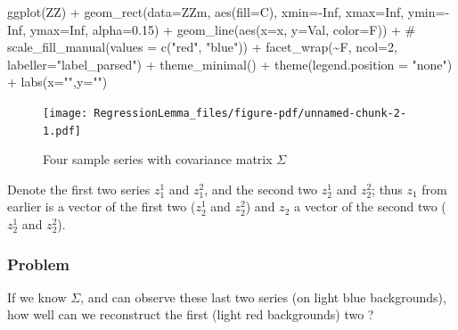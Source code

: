 \documentclass[
  letterpaper,
]{book}
\newenvironment{Shaded}{\begin{snugshade}}{\end{snugshade}}
\newcommand{\AttributeTok}[1]{\textcolor[rgb]{0.40,0.45,0.13}{#1}}
\newcommand{\CommentTok}[1]{\textcolor[rgb]{0.37,0.37,0.37}{#1}}
\newcommand{\ConstantTok}[1]{\textcolor[rgb]{0.56,0.35,0.01}{#1}}
\newcommand{\DecValTok}[1]{\textcolor[rgb]{0.68,0.00,0.00}{#1}}
\newcommand{\FloatTok}[1]{\textcolor[rgb]{0.68,0.00,0.00}{#1}}
\newcommand{\FunctionTok}[1]{\textcolor[rgb]{0.28,0.35,0.67}{#1}}
\newcommand{\NormalTok}[1]{\textcolor[rgb]{0.00,0.23,0.31}{#1}}
\newcommand{\SpecialCharTok}[1]{\textcolor[rgb]{0.37,0.37,0.37}{#1}}
\newcommand{\StringTok}[1]{\textcolor[rgb]{0.13,0.47,0.30}{#1}}
\begin{document}
\begin{Shaded}
\begin{Highlighting}[]
\FunctionTok{ggplot}\NormalTok{(ZZ) }\SpecialCharTok{+}   
  \FunctionTok{geom\_rect}\NormalTok{(}\AttributeTok{data=}\NormalTok{ZZm, }\FunctionTok{aes}\NormalTok{(}\AttributeTok{fill=}\NormalTok{C), }
            \AttributeTok{xmin=}\SpecialCharTok{{-}}\ConstantTok{Inf}\NormalTok{, }\AttributeTok{xmax=}\ConstantTok{Inf}\NormalTok{, }
            \AttributeTok{ymin=}\SpecialCharTok{{-}}\ConstantTok{Inf}\NormalTok{, }\AttributeTok{ymax=}\ConstantTok{Inf}\NormalTok{, }\AttributeTok{alpha=}\FloatTok{0.15}\NormalTok{) }\SpecialCharTok{+} 
  \FunctionTok{geom\_line}\NormalTok{(}\FunctionTok{aes}\NormalTok{(}\AttributeTok{x=}\NormalTok{x, }\AttributeTok{y=}\NormalTok{Val, }\AttributeTok{color=}\NormalTok{F)) }\SpecialCharTok{+}
  \CommentTok{\# scale\_fill\_manual(values = c("red", "blue")) + }
  \FunctionTok{facet\_wrap}\NormalTok{(}\SpecialCharTok{\textasciitilde{}}\NormalTok{F, }\AttributeTok{ncol=}\DecValTok{2}\NormalTok{, }\AttributeTok{labeller=}\StringTok{"label\_parsed"}\NormalTok{) }\SpecialCharTok{+}
  \FunctionTok{theme\_minimal}\NormalTok{() }\SpecialCharTok{+}
  \FunctionTok{theme}\NormalTok{(}\AttributeTok{legend.position =} \StringTok{"none"}\NormalTok{) }\SpecialCharTok{+}
  \FunctionTok{labs}\NormalTok{(}\AttributeTok{x=}\StringTok{""}\NormalTok{,}\AttributeTok{y=}\StringTok{""}\NormalTok{)}
\end{Highlighting}
\end{Shaded}

\begin{figure}[H]

{\centering \texttt{[image: RegressionLemma\_files/figure-pdf/unnamed-chunk-2-1.pdf]}

}

\caption{Four sample series with covariance matrix \(\Sigma\)}

\end{figure}

Denote the first two series \(z_1^1\) and \(z_1^2\), and the second two
\(z_2^1\) and \(z_2^2\); thus \(z_1\) from earlier is a vector of the
first two (\(z_2^1\) and \(z_2^2\)) and \(z_2\) a vector of the second
two (\(z_2^1\) and \(z_2^2\)).

\hypertarget{problem}{%
\subsubsection{Problem}\label{problem}}

If we know \(\Sigma\), and can observe these last two series (on light
blue backgrounds), how well can we reconstruct the first (light red
backgrounds) two ?
\end{document}
